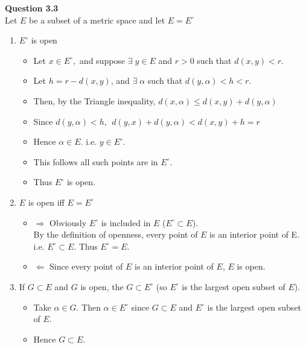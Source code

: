 \documentclass[12pt]{article}
\begin{document}
\newpage
\noindent
\textbf{Question 3.3}\\
Let $E$ be a subset of a metric space and let $E = E^\circ$
\begin{enumerate}[label=(\roman*)]
    \item $E^\circ$ is open
        \begin{itemize}
            \item Let $x\in E^\circ,$ and suppose $\exists\;y\in E$ and $r>0$ such that $d(x,y) < r$.
            \item Let $h = r - d(x,y)$, and $\exists\;\alpha$ such that $d(y,\alpha) < h < r$. 
            \item Then, by the Triangle inequality, $d(x,\alpha) \le d(x,y) + d(y,\alpha)$
            \item Since $d(y,\alpha) < h$, $\; d(y,x) + d(y,\alpha) < d(x,y) + h = r$
            \item Hence $\alpha \in E$. i.e. $y \in E^\circ$.
            \item This follows all such points are in $E^\circ$.
            \item Thus $E^\circ$ is open.
        \end{itemize}
    \item $E$ is open iff $E = E^\circ$
        \begin{itemize}
            \item $\Rightarrow$ Obviously $E^\circ$ is included in $E$ ($E^\circ \subset E$).\\
                  By the definition of openness, every point of $E$ is an interior point of E.\\
                  i.e. $E^\circ \subset E$. Thus $E^\circ = E.$
            
            \item $\Leftarrow$ Since every point of $E$ is an interior point of $E$, $E$ is open.
        \end{itemize}
    
    \item If $G \subset E$ and $G$ is open, the $G \subset E^\circ$ (so $E^\circ$ is the largest open subset of $E$).
        \begin{itemize}
            \item Take $\alpha \in G$. Then $\alpha \in E^\circ$ since $G \subset E$ and $E^\circ$ is the largest open subset of $E$.
            \item Hence $G \subset E$.
        \end{itemize}
    

\end{enumerate}
\end{document}
